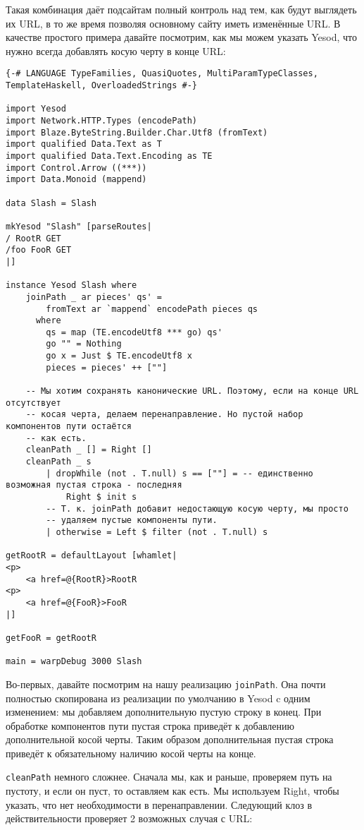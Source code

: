 Такая комбинация даёт подсайтам полный контроль над тем, как будут выглядеть их URL, в то же время позволяя основному сайту иметь изменённые URL. В качестве простого примера давайте посмотрим, как мы можем указать Yesod, что нужно всегда добавлять косую черту в конце URL:

\begin{lstlisting}
{-# LANGUAGE TypeFamilies, QuasiQuotes, MultiParamTypeClasses, TemplateHaskell, OverloadedStrings #-}

import Yesod
import Network.HTTP.Types (encodePath)
import Blaze.ByteString.Builder.Char.Utf8 (fromText)
import qualified Data.Text as T
import qualified Data.Text.Encoding as TE
import Control.Arrow ((***))
import Data.Monoid (mappend)

data Slash = Slash

mkYesod "Slash" [parseRoutes|
/ RootR GET
/foo FooR GET
|]

instance Yesod Slash where
    joinPath _ ar pieces' qs' =
        fromText ar `mappend` encodePath pieces qs
      where
        qs = map (TE.encodeUtf8 *** go) qs'
        go "" = Nothing
        go x = Just $ TE.encodeUtf8 x
        pieces = pieces' ++ [""]

    -- Мы хотим сохранять канонические URL. Поэтому, если на конце URL отсутствует
    -- косая черта, делаем перенаправление. Но пустой набор компонентов пути остаётся
    -- как есть.
    cleanPath _ [] = Right []
    cleanPath _ s
        | dropWhile (not . T.null) s == [""] = -- единственно возможная пустая строка - последняя
            Right $ init s
        -- Т. к. joinPath добавит недостающую косую черту, мы просто
        -- удаляем пустые компоненты пути.
        | otherwise = Left $ filter (not . T.null) s

getRootR = defaultLayout [whamlet|
<p>
    <a href=@{RootR}>RootR
<p>
    <a href=@{FooR}>FooR
|]

getFooR = getRootR

main = warpDebug 3000 Slash
\end{lstlisting}%

Во-первых, давайте посмотрим на нашу реализацию \lstinline!joinPath!. Она почти полностью скопирована из реализации по умолчанию в Yesod c одним изменением: мы добавляем дополнительную пустую строку в конец. При обработке компонентов пути пустая строка приведёт к добавлению дополнительной косой черты. Таким образом дополнительная пустая строка приведёт к обязательному наличию косой черты на конце.

\lstinline!cleanPath! немного сложнее. Сначала мы, как и раньше, проверяем путь на пустоту, и если он пуст, то оставляем как есть. Мы используем Right, чтобы указать, что нет необходимости в перенаправлении. Следующий клоз в действительности проверяет 2 возможных случая с URL:


